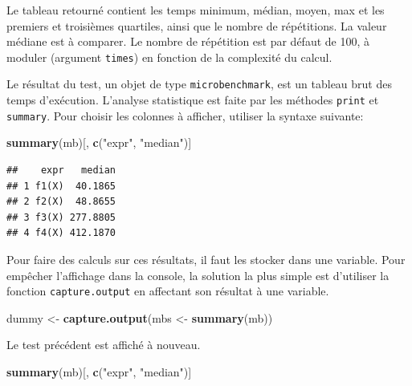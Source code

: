 \documentclass[
  12pt,
  french,
  a4paper,
  extrafontsizes,onecolumn,openright
  ]{memoir}
\newenvironment{Shaded}{\begin{snugshade}}{\end{snugshade}}
\newcommand{\KeywordTok}[1]{\textcolor[rgb]{0.13,0.29,0.53}{\textbf{#1}}}
\newcommand{\NormalTok}[1]{#1}
\newcommand{\StringTok}[1]{\textcolor[rgb]{0.31,0.60,0.02}{#1}}
\begin{document}
Le tableau retourné contient les temps minimum, médian, moyen, max et les premiers et troisièmes quartiles, ainsi que le nombre de répétitions.
La valeur médiane est à comparer.
Le nombre de répétition est par défaut de 100, à moduler (argument \texttt{times}) en fonction de la complexité du calcul.

Le résultat du test, un objet de type \texttt{microbenchmark}, est un tableau brut des temps d'exécution.
L'analyse statistique est faite par les méthodes \texttt{print} et \texttt{summary}.
Pour choisir les colonnes à afficher, utiliser la syntaxe suivante:

\scriptsize

\begin{Shaded}
\begin{Highlighting}[]
\KeywordTok{summary}\NormalTok{(mb)[, }\KeywordTok{c}\NormalTok{(}\StringTok{"expr"}\NormalTok{, }\StringTok{"median"}\NormalTok{)]}
\end{Highlighting}
\end{Shaded}

\begin{verbatim}
##    expr   median
## 1 f1(X)  40.1865
## 2 f2(X)  48.8655
## 3 f3(X) 277.8805
## 4 f4(X) 412.1870
\end{verbatim}

\normalsize

Pour faire des calculs sur ces résultats, il faut les stocker dans une variable.
Pour empêcher l'affichage dans la console, la solution la plus simple est d'utiliser la fonction \texttt{capture.output} en affectant son résultat à une variable.

\scriptsize

\begin{Shaded}
\begin{Highlighting}[]
\NormalTok{dummy <-}\StringTok{ }\KeywordTok{capture.output}\NormalTok{(mbs <-}\StringTok{ }\KeywordTok{summary}\NormalTok{(mb))}
\end{Highlighting}
\end{Shaded}

\normalsize

Le test précédent est affiché à nouveau.

\scriptsize

\begin{Shaded}
\begin{Highlighting}[]
\KeywordTok{summary}\NormalTok{(mb)[, }\KeywordTok{c}\NormalTok{(}\StringTok{"expr"}\NormalTok{, }\StringTok{"median"}\NormalTok{)]}
\end{Highlighting}
\end{Shaded}
\end{document}
